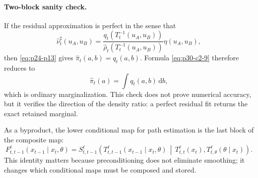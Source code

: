 \documentclass[11pt]{article}
\numberwithin{equation}{section}
\newcommand{\dd}{\,\mathrm d}
\begin{document}
\paragraph{Two-block sanity check.}
If the residual approximation is perfect in the sense that
\begin{equation}
    \widehat\nu_t^\sharp(u_A,u_B)
    =
    \frac{q_t(T_t^{-1}(u_A,u_B))}
    {\widehat\rho_t(T_t^{-1}(u_A,u_B))}
    \eta(u_A,u_B),
    \label{eq:p30-c2-10}
\end{equation}
then \eqref{eq:p24-p13} gives \(\widehat\pi_t(a,b)=q_t(a,b)\).  Formula
\eqref{eq:p30-c2-9} therefore reduces to
\begin{equation}
    \widehat\pi_t(a)
    =
    \int q_t(a,b)\dd b,
    \label{eq:p30-c2-11}
\end{equation}
which is ordinary marginalization.  This check does not prove numerical
accuracy, but it verifies the direction of the density ratio: a perfect
residual fit returns the exact retained marginal.

As a byproduct, the lower conditional map for path estimation is the last block
of the composite map:
\begin{equation}
    F_{t,t-1}^{\ell}(x_{t-1}\mid x_t,\theta)
    =
    S_{t,t-1}^{\ell}
    \!\left(
    T_{t,t-1}^{\ell}(x_{t-1}\mid x_t,\theta)
    \,\middle|\,
    T_{t,t}^{\ell}(x_t),
    T_{t,\theta}^{\ell}(\theta\mid x_t)
    \right).
    \label{eq:p24-p18}
\end{equation}
This identity matters because preconditioning does not eliminate smoothing; it
changes which conditional maps must be composed and stored.

\begin{center}
\end{center}
\end{document}
